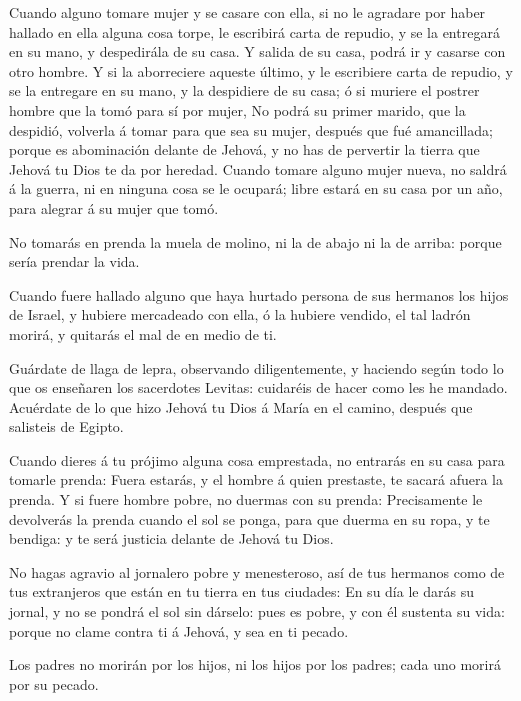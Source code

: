  Cuando alguno tomare mujer y se casare con ella, si no le
agradare por haber hallado en ella alguna cosa torpe, le escribirá carta
de repudio, y se la entregará en su mano, y despedirála de su casa.
 Y salida de su casa, podrá ir y casarse con otro hombre.
 Y si la aborreciere aqueste último, y le escribiere carta
de repudio, y se la entregare en su mano, y la despidiere de su casa; ó
si muriere el postrer hombre que la tomó para sí por mujer, 
No podrá su primer marido, que la despidió, volverla á tomar para que
sea su mujer, después que fué amancillada; porque es abominación delante
de Jehová, y no has de pervertir la tierra que Jehová tu Dios te da por
heredad.  Cuando tomare alguno mujer nueva, no saldrá á la
guerra, ni en ninguna cosa se le ocupará; libre estará en su casa por un
año, para alegrar á su mujer que tomó.

 No tomarás en prenda la muela de molino, ni la de abajo ni
la de arriba: porque sería prendar la vida.

 Cuando fuere hallado alguno que haya hurtado persona de sus
hermanos los hijos de Israel, y hubiere mercadeado con ella, ó la
hubiere vendido, el tal ladrón morirá, y quitarás el mal de en medio de
ti.

 Guárdate de llaga de lepra, observando diligentemente, y
haciendo según todo lo que os enseñaren los sacerdotes Levitas:
cuidaréis de hacer como les he mandado.  Acuérdate de lo que
hizo Jehová tu Dios á María en el camino, después que salisteis de
Egipto.

 Cuando dieres á tu prójimo alguna cosa emprestada, no
entrarás en su casa para tomarle prenda:  Fuera estarás, y
el hombre á quien prestaste, te sacará afuera la prenda.  Y
si fuere hombre pobre, no duermas con su prenda: 
Precisamente le devolverás la prenda cuando el sol se ponga, para que
duerma en su ropa, y te bendiga: y te será justicia delante de Jehová tu
Dios.

 No hagas agravio al jornalero pobre y menesteroso, así de
tus hermanos como de tus extranjeros que están en tu tierra en tus
ciudades:  En su día le darás su jornal, y no se pondrá el
sol sin dárselo: pues es pobre, y con él sustenta su vida: porque no
clame contra ti á Jehová, y sea en ti pecado.

 Los padres no morirán por los hijos, ni los hijos por los
padres; cada uno morirá por su pecado.

